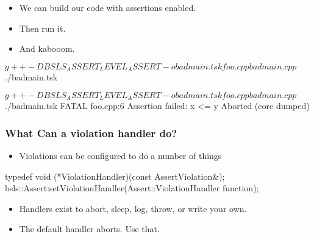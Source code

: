 \begin{frame}[fragile]
\begin{overprint}
  \begin{itemize}
  \item<1->{We can build our code with assertions enabled.}
  \item<2->{Then run it.}
  \item<3->{And kabooom.}
  \end{itemize}
\end{overprint}

\begin{overprint}


\begin{shellbox}
$ g++ -DBSLS_ASSERT_LEVEL_ASSERT -o badmain.tsk foo.cpp badmain.cpp
$ ./badmain.tsk
\end{shellbox}

\begin{shellbox}
$ g++ -DBSLS_ASSERT_LEVEL_ASSERT -o badmain.tsk foo.cpp badmain.cpp
$ ./badmain.tsk
FATAL foo.cpp:6 Assertion failed: x <= y
Aborted (core dumped)
\end{shellbox}

\end{overprint}
\end{frame}

\begin{frame}[fragile]
  \frametitle{What Can a violation handler do?}
  \begin{itemize}
  \item{Violations can be configured to do a number of things} \pause
  \end{itemize}
  \begin{cppcodebox}
    typedef void (*ViolationHandler)(const AssertViolation&);
    bsls::Assert:setViolationHandler(Assert::ViolationHandler function);
  \end{cppcodebox}
  \begin{itemize} \pause
  \item{Handlers exist to abort, sleep, log, throw, or write your own.} \pause
  \item{The default handler aborts.  Use that.} 
  \end{itemize}
\end{frame}

